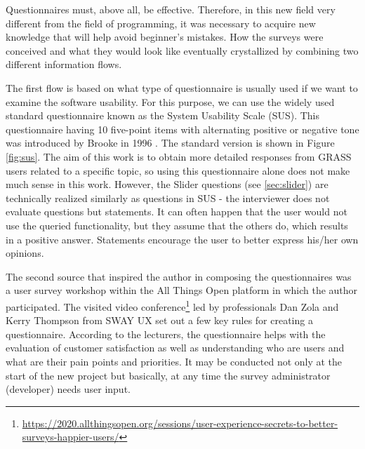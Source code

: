 \documentclass[a4paper,10pt,twoside]{article}
\begin{document}
Questionnaires must, above all, be effective. Therefore, in this new
field very different from the field of programming, it was necessary
to acquire new knowledge that will help avoid beginner's mistakes. How
the surveys were conceived and what they would look like eventually
crystallized by combining two different information flows.

The first flow is based on what type of questionnaire is usually used
if we want to examine the software usability. For this purpose, we can
use the widely used standard questionnaire known as the System
Usability Scale (SUS). This questionnaire having 10 five-point items
with alternating positive or negative tone was introduced by Brooke in
1996 \cite{sus}. The standard version is shown in Figure
\ref{fig:sus}. The aim of this work is to obtain more detailed
responses from GRASS users related to a specific topic, so using this
questionnaire alone does not make much sense in this work. However,
the Slider questions (see \ref{sec:slider}) are technically realized
similarly as questions in SUS - the interviewer does not evaluate
questions but statements. It can often happen that the user would not
use the queried functionality, but they assume that the others do,
which results in a positive answer. Statements encourage the user to
better express his/her own opinions.

The second source that inspired the author in composing the
questionnaires was a user survey workshop within the All Things Open
platform in which the author participated. The visited video
conference\footnote{\url{https://2020.allthingsopen.org/sessions/user-experience-secrets-to-better-surveys-happier-users/}}
led by professionals Dan Zola and Kerry Thompson from SWAY UX set out
a few key rules for creating a questionnaire. According to the
lecturers, the questionnaire helps with the evaluation of customer
satisfaction as well as understanding who are users and what are their
pain points and priorities. It may be conducted not only at the start
of the new project but basically, at any time the survey administrator
(developer) needs user input.
\end{document}
